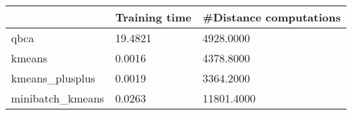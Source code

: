 \begin{table}[htbp]
\centering
\begin{tabular}{lll}
\toprule
 & Training time & #Distance computations \\
\midrule
qbca & 19.4821 & 4928.0000 \\
kmeans & 0.0016 & 4378.8000 \\
kmeans_plusplus & 0.0019 & 3364.2000 \\
minibatch_kmeans & 0.0263 & 11801.4000 \\
\bottomrule
\end{tabular}
\end{table}
